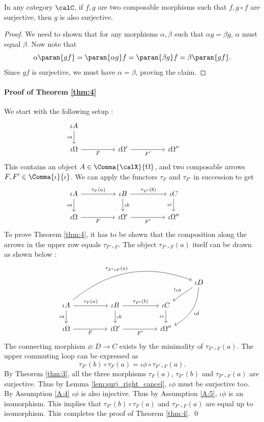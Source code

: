 \documentclass[12pt,oneside]{article}
\begin{document}
\begin{lemma} \label{lem:surj_right_cancel}
	In any category $\calC$, if $f,g$ are two composable morphisms such that $f, g\circ f$ are surjective, then $g$ is also surjective.
\end{lemma} 

\begin{proof} We need to shown that for any morphisms $\alpha, \beta$ such that $\alpha g = \beta g$, $\alpha$ must equal $\beta$. Now note that
	\[ \alpha \paran{g f} = \paran{\alpha g} f = \paran{\beta g} f = \beta \paran{gf} . \]
	Since $gf$ is surjective, we must have $\alpha=\beta$, proving the claim. 
\end{proof}

\paragraph{Proof of Theorem \ref{thm:4}} We start with the following setup : %
\[\begin{tikzcd}
	\iota A \arrow[d, "\iota a"']  \\
	\iota \Omega \arrow[rr, "F"'] & & \iota \Omega' \arrow[rr, "F'"'] & & \iota \Omega'' & 
\end{tikzcd}\]
% 
This contains an object $A\in \Comma{\calX}{\Omega}$, and two composable arrows $F, F' \in \Comma{\iota}{\iota}$. We can apply the functors $\tau_F$ and $\tau_{F'}$ in succession to get
%
\[\begin{tikzcd}
	\iota A \arrow[d, "\iota a"'] \arrow[rr, "\tau_{F} (a)"] & & \iota B \arrow[d, "\iota b"] \arrow[rr, "\tau_{F'} (b)"] & & \iota C \arrow[d, "\iota c"']  & \\ 
	\iota \Omega \arrow[rr, "F"'] & & \iota \Omega' \arrow[rr, "F'"'] & & \iota \Omega'' & 
\end{tikzcd}\]
% 
To prove Theorem \ref{thm:4}, it has to be shown that the composition along the arrows in the upper row equals $\tau_{F'\circ F}$. The object $\tau_{F'\circ F}(a)$ itself can be drawn as shown below :
%
\[\begin{tikzcd}
	& & & & & \iota D \arrow[ldd, "\iota d", bend left]  \arrow[ld, "! \iota \phi"'] \\
	\iota A \arrow[d, "\iota a"'] \arrow[rr, "\tau_{F} (a)"] \arrow[rrrrru, "\tau_{F'\circ F} (a)", bend left] & & \iota B \arrow[d, "\iota b"] \arrow[rr, "\tau_{F'} (b)"] & & \iota C \arrow[d, "\iota c"'] & \\
	\iota \Omega \arrow[rr, "F"'] & & \iota \Omega' \arrow[rr, "F'"'] & & \iota \Omega'' & 
\end{tikzcd}\]
% 
The connecting morphism $\phi : D \to C$ exists by the minimality of $\tau_{F'\circ F}(a)$. The upper commuting loop can be expressed as
%
\[ \tau_{F'} (b) \circ \tau_{F} (a) = \iota \phi \circ \tau_{F'\circ F} (a) . \]
%
By Theorem \ref{thm:3}, all the three morphisms $\tau_{F} (a)$, $\tau_{F'} (b)$ and $\tau_{F'\circ F} (a)$ are surjective. Thus by Lemma \ref{lem:surj_right_cancel}, $\iota \phi$ must be surjective too. By Assumption \ref{A:4} $\iota \phi$ is also injective. Thus by Assumption \ref{A:5}, $\iota \phi$ is an isomorphism. This implies that $\tau_{F'} (b) \circ \tau_{F} (a)$ and $\tau_{F'\circ F} (a)$ are equal up to isomorphism. This completes the proof of Theorem \ref{thm:4}. \qed 
\end{document}
